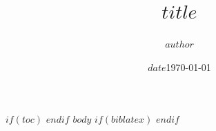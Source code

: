 \documentclass{article}
\author{$author$}
\author{}
\title{$title$}
\title{}
\date{$date$}
\date{\today}
\begin{document}
\maketitle
$if(toc)$
\tableofcontents
\clearpage
$endif$
$body$
$if(biblatex)$
\newpage
\printbibliography
$endif$
\end{document}
